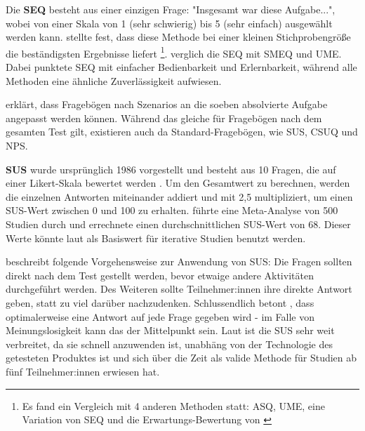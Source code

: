 \vspace{\baselineskip}

Die \textbf{\ac{SEQ}} besteht aus einer einzigen Frage: "Insgesamt war diese Aufgabe...", wobei von einer Skala von 1 (sehr schwierig) bis 5 (sehr einfach) ausgewählt werden kann. \textcite{tedescoComparisonMethods2006} stellte fest, dass diese Methode bei einer kleinen Stichprobengröße die beständigsten Ergebnisse liefert \footnote{Es fand ein Vergleich mit 4 anderen Methoden statt: \ac{ASQ}, \ac{UME}, eine Variation von \ac{SEQ} und die Erwartungs-Bewertung von \textcite{albertThisWhat2003}}. \textcite{sauroComparisonThree2009} verglich die \ac{SEQ} mit \ac{SMEQ} und \ac{UME}. Dabei punktete \ac{SEQ} mit einfacher Bedienbarkeit und Erlernbarkeit, während alle Methoden eine ähnliche Zuverlässigkeit aufwiesen.

\textcite{barnumUsabilityTesting2021} erklärt, dass Fragebögen nach Szenarios an die soeben absolvierte Aufgabe angepasst werden können. Während das gleiche für Fragebögen nach dem gesamten Test gilt, existieren auch da Standard-Fragebögen, wie \ac{SUS}, \ac{CSUQ} und \ac{NPS}.

\vspace{\baselineskip}

\textbf{\ac{SUS}} wurde ursprünglich 1986 vorgestellt und besteht aus 10 Fragen, die auf einer Likert-Skala bewertet werden \parencite{brookeSUSQuick1996}. Um den Gesamtwert zu berechnen, werden die einzelnen Antworten miteinander addiert und mit 2,5 multipliziert, um einen \ac{SUS}-Wert zwischen 0 und 100 zu erhalten. \textcite{sauroMeasuringUsability2011} führte eine Meta-Analyse von 500 Studien durch und errechnete einen durchschnittlichen \ac{SUS}-Wert von 68. Dieser Werte könnte laut \textcite{barnumUsabilityTesting2021} als Basiswert für iterative Studien benutzt werden.

\textcite{brookeSUSQuick1996} beschreibt folgende Vorgehensweise zur Anwendung von \ac{SUS}: Die Fragen sollten direkt nach dem Test gestellt werden, bevor etwaige andere Aktivitäten durchgeführt werden. Des Weiteren sollte Teilnehmer:innen ihre direkte Antwort geben, statt zu viel darüber nachzudenken. Schlussendlich betont \textcite{brookeSUSQuick1996}, dass optimalerweise eine Antwort auf jede Frage gegeben wird - im Falle von Meinungslosigkeit kann das der Mittelpunkt sein. Laut \textcite{barnumUsabilityTesting2021} ist die \ac{SUS} sehr weit verbreitet, da sie schnell anzuwenden ist, unabhäng von der Technologie des getesteten Produktes ist und sich über die Zeit als valide Methode für Studien ab fünf Teilnehmer:innen erwiesen hat.

